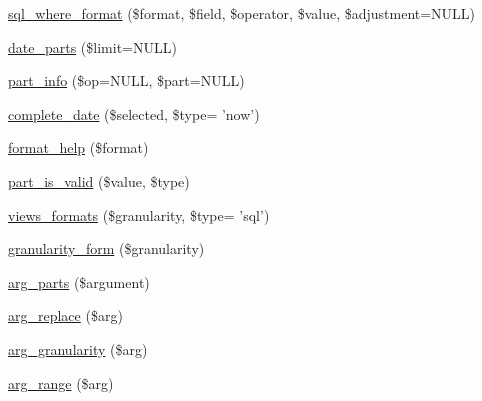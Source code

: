 \begin{DoxyCompactItemize}
\item 
\hyperlink{classdate__sql__handler_a6eafe804210a031a0057e8ff84eca6a8}{sql\_\-where\_\-format} (\$format, \$field, \$operator, \$value, \$adjustment=NULL)
\item 
\hyperlink{classdate__sql__handler_ae27e6fee0bc6f11a741b0501dc2c295f}{date\_\-parts} (\$limit=NULL)
\item 
\hyperlink{classdate__sql__handler_a867091165b26b483cbf7301978871d26}{part\_\-info} (\$op=NULL, \$part=NULL)
\item 
\hyperlink{classdate__sql__handler_a49b92ba3b97d3f770652c271591e524d}{complete\_\-date} (\$selected, \$type= 'now')
\item 
\hyperlink{classdate__sql__handler_ae87411b56e77408c61fbde01edf5b1d1}{format\_\-help} (\$format)
\item 
\hyperlink{classdate__sql__handler_af0dc94f9fde296bc8dce819235ba387b}{part\_\-is\_\-valid} (\$value, \$type)
\item 
\hyperlink{classdate__sql__handler_a3a8cc9c8c0f40515901e8a7bf6299439}{views\_\-formats} (\$granularity, \$type= 'sql')
\item 
\hyperlink{classdate__sql__handler_add4b2f59b4d1da58336ffa0afcd97f03}{granularity\_\-form} (\$granularity)
\item 
\hyperlink{classdate__sql__handler_a128dc221ac52eea10f324d94b2b73301}{arg\_\-parts} (\$argument)
\item 
\hyperlink{classdate__sql__handler_a13e12c367362a87b97038a3234957305}{arg\_\-replace} (\$arg)
\item 
\hyperlink{classdate__sql__handler_a4e05688eeafa5d0c9f2435d13a0bb2c2}{arg\_\-granularity} (\$arg)
\item 
\hyperlink{classdate__sql__handler_a3c56ad455684b8f9689980d5c1782a2b}{arg\_\-range} (\$arg)
\end{DoxyCompactItemize}
